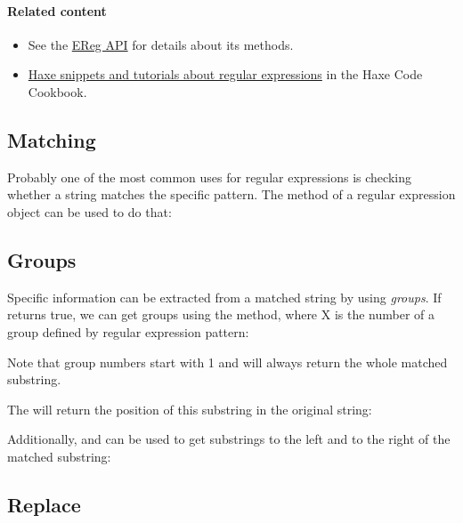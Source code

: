\paragraph{Related content}
\begin{itemize}
	\item See the \href{https://api.haxe.org/EReg.html}{EReg API} for details about its methods. 
	\item \href{http://code.haxe.org/tag/ereg.html}{Haxe snippets and tutorials about regular expressions} in the Haxe Code Cookbook.
\end{itemize}

\subsection{Matching}
\label{std-regex-match}

Probably one of the most common uses for regular expressions is checking whether a string matches the specific pattern. The  method of a regular expression object can be used to do that:

\subsection{Groups}
\label{std-regex-groups}

Specific information can be extracted from a matched string by using \emph{groups}. If  returns true, we can get groups using the  method, where X is the number of a group defined by regular expression pattern:


Note that group numbers start with 1 and  will always return the whole matched substring.

The  will return the position of this substring in the original string:


Additionally,  and  can be used to get substrings to the left and to the right of the matched substring:


\subsection{Replace}
\label{std-regex-replace}

